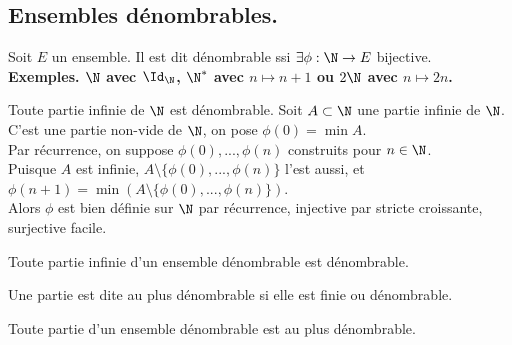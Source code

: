 \documentclass[11pt]{article}
\begin{document}
\subsection{Ensembles dénombrables.}

\begin{defi}{}{}
    Soit $E$ un ensemble. Il est dit dénombrable ssi $\exists \phi:\N\to E$ bijective.\\
    \bf{Exemples.} $\N$ avec $\Id_\N$, $\N^*$ avec $n\mapsto n+1$ ou $2\N$ avec $n\mapsto 2n$.
\end{defi}

\vspace*{-0.8cm}

\begin{prop}{}{}
    Toute partie infinie de $\N$ est dénombrable.
    \tcblower
    Soit $A\subset \N$ une partie infinie de $\N$.\\
    C'est une partie non-vide de $\N$, on pose $\phi(0)=\min A$.\\
    Par récurrence, on suppose $\phi(0),...,\phi(n)$ construits pour $n\in\N$.\\
    Puisque $A$ est infinie, $A\setminus\{\phi(0),...,\phi(n)\}$ l'est aussi, et $\phi(n+1)=\min(A\setminus\{\phi(0),...,\phi(n)\})$.\\
    Alors $\phi$ est bien définie sur $\N$ par récurrence, injective par stricte croissante, surjective facile.
\end{prop}

\vspace*{-0.8cm}

\begin{prop}{}{}
    Toute partie infinie d'un ensemble dénombrable est dénombrable.
\end{prop}

\vspace*{-0.8cm}

\begin{defi}{}{}
    Une partie est dite au plus dénombrable si elle est finie ou dénombrable.
\end{defi}

\vspace*{-0.8cm}

\begin{corr}{}{}
    Toute partie d'un ensemble dénombrable est au plus dénombrable.
\end{corr}

\vspace*{-0.8cm}
\end{document}
